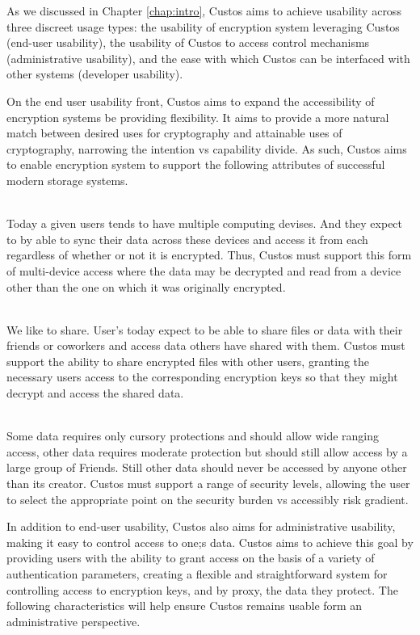 As we discussed in Chapter \ref{chap:intro}, Custos aims to achieve
usability across three discreet usage types: the usability of
encryption system leveraging Custos (end-user usability), the
usability of Custos to access control mechanisms (administrative
usability), and the ease with which Custos can be interfaced with
other systems (developer usability).

On the end user usability front, Custos aims to expand the
accessibility of encryption systems be providing flexibility. It aims
to provide a more natural match between desired uses for cryptography
and attainable uses of cryptography, narrowing the intention vs
capability divide. As such, Custos aims to enable encryption system to
support the following attributes of successful modern storage systems.

\begin{packed_desc}
\item[Multi-Device Support] \hfill \\ Today a given users tends to
  have multiple computing devises. And they expect to by able to sync
  their data across these devices and access it from each regardless
  of whether or not it is encrypted. Thus, Custos must support this
  form of multi-device access where the data may be decrypted and read
  from a device other than the one on which it was originally
  encrypted.
\item[Multi-User Support] \hfill \\ We like to share. User's today
  expect to be able to share files or data with their friends or
  coworkers and access data others have shared with them. Custos must
  support the ability to share encrypted files with other users,
  granting the necessary users access to the corresponding encryption
  keys so that they might decrypt and access the shared data.
\item[Flexible Protection Semantics] \hfill \\ Some data requires only
  cursory protections and should allow wide ranging access, other data
  requires moderate protection but should still allow access by a
  large group of Friends. Still other data should never be accessed by
  anyone other than its creator. Custos must support a range of
  security levels, allowing the user to select the appropriate point
  on the security burden vs accessibly risk gradient.
\end{packed_desc}

In addition to end-user usability, Custos also aims for administrative
usability, making it easy to control access to one;s data. Custos aims
to achieve this goal by providing users with the ability to grant
access on the basis of a variety of authentication parameters,
creating a flexible and straightforward system for controlling access
to encryption keys, and by proxy, the data they protect. The following
characteristics will help ensure Custos remains usable form an
administrative perspective.

